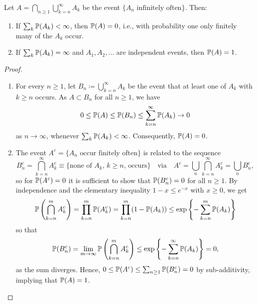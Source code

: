 \documentclass[10pt, a4paper]{article}
\begin{document}
\begin{lemma}
    Let $A = \bigcap_{n \geq 1}\bigcup_{k = n}^{\infty}A_k$ be the event $\{A_n\text{ infinitely often}\}$.
    Then:
    \begin{enumerate}[label = (\alph*)]
        \item If $\sum_{k}\P(A_k) < \infty$,
        then $\P(A) = 0$,
        i.e.,
        with probability one only finitely many of the $A_k$ occur.

        \item If $\sum_{k}\P(A_k) = \infty$ and $A_1, A_2, \dotsc$ are independent events,
        then $\P(A) = 1$.
    \end{enumerate}

    \begin{proof}\phantom{}
        \begin{enumerate}[label = (\alph*)]
            \item For every $n \geq 1$,
            let $B_n \coloneqq \bigcup_{k = n}^{\infty}A_k$ be the event that at least one of $A_k$ with $k \geq n$ occurs.
            As $A \subset B_n$ for all $n \geq 1$,
            we have
            \[
            0 \leq \P(A) \leq \P(B_n) \leq \sum_{k = n}^{\infty}\P(A_k) \to 0
            \]
            as $n \to \infty$,
            whenever $\sum_{k}\P(A_k) < \infty$.
            Consequently,
            $\P(A) = 0$.

            \item The event $A ^ c = \{A_n\text{ occur finitely often}\}$ is related to the sequence
            \[
            B_n ^ c = \bigcap_{k = n}^{\infty}A_{k}^{c} \equiv \{\text{none of $A_k$,
            $k \geq n$,
            occurs}\}\quad\text{via}\quad A ^ c = \bigcup_{n}\bigcap_{k = n}^{\infty}A_{k}^{c} = \bigcup_{n}B_{n}^{c},
            \]
            so for $\P(A ^ c) = 0$ it is sufficient to show that $\P(B_{n}^{c}) = 0$ for all $n \geq 1$.
            By independence and the elementary inequality $1 - x \leq e ^ {-x}$ with $x \geq 0$,
            we get
            \[
            \P\left(\bigcap_{k = n}^{m}A_{k}^{c}\right) = \prod_{k = n}^{m}\P(A_{k}^{c}) = \prod_{k = n}^{m}(1 - \P(A_k)) \leq \exp\left\{-\sum_{k = n}^{m}\P(A_k)\right\}
            \]
            so that
            \[
            \P(B_{n}^{c}) = \lim_{m \to \infty}\P\left(\bigcap_{k = n}^{m}A_{k}^{c}\right) \leq \exp\left\{-\sum_{k = n}^{\infty}\P(A_k)\right\} = 0,
            \]
            as the sum diverges.
            Hence,
            $0 \leq \P(A ^ c) \leq \sum_{n \geq 1}\P(B_{n}^{c}) = 0$ by sub-additivity,
            implying that $\P(A) = 1$.
        \end{enumerate}
    \end{proof}
\end{lemma}
\end{document}
